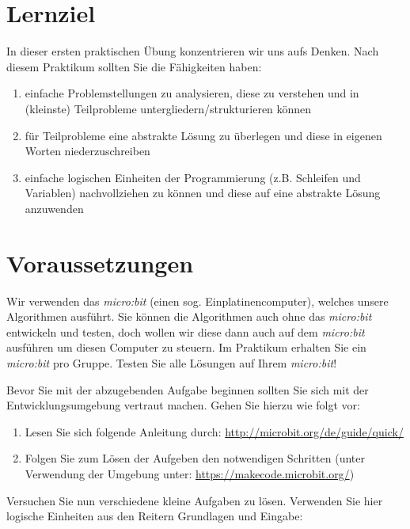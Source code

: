 \documentclass{hmLab}
\subtitle{Kontrollstrukturen mit dem micro:bit}
\author{Prof.\,Dr.-Ing.\,Martin Hobelsberger\\Dr.\,Benedikt Zönnchen\\Prof.\,Dr.-Ing.\,Benedikt Dietrich}
\begin{document}
\maketitle

\section*{Lernziel}

In dieser ersten praktischen Übung konzentrieren wir uns aufs Denken.
Nach diesem Praktikum sollten Sie die Fähigkeiten haben:

\begin{enumerate}[label=$\bullet$]
	\item einfache Problemstellungen zu analysieren, diese zu verstehen und in (kleinste) Teilprobleme untergliedern/strukturieren können 
	\item für Teilprobleme eine abstrakte Lösung zu überlegen und diese in eigenen Worten niederzuschreiben 
	\item einfache logischen Einheiten der Programmierung (z.B. Schleifen und Variablen) nachvollziehen zu können und diese auf eine abstrakte Lösung anzuwenden
\end{enumerate}

\section*{Voraussetzungen}

Wir verwenden das \textit{micro:bit} (einen sog. Einplatinencomputer), welches unsere Algorithmen ausführt.
Sie können die Algorithmen auch ohne das \textit{micro:bit} entwickeln und testen, doch wollen wir diese dann auch auf dem \textit{micro:bit} ausführen um diesen Computer zu steuern.
Im Praktikum erhalten Sie ein \textit{micro:bit} pro Gruppe.
Testen Sie alle Lösungen auf Ihrem \textit{micro:bit}!

\newpage


Bevor Sie mit der abzugebenden Aufgabe beginnen sollten Sie sich mit der Entwicklungsumgebung vertraut machen. 
Gehen Sie hierzu wie folgt vor:

\begin{enumerate}[label=(\arabic*)]
	\item Lesen Sie sich folgende Anleitung durch: \href{http://microbit.org/de/guide/quick/}{http://microbit.org/de/guide/quick/}
	\item Folgen Sie zum Lösen der Aufgeben den notwendigen Schritten (unter Verwendung der Umgebung unter: \href{https://makecode.microbit.org/}{https://makecode.microbit.org/})
\end{enumerate}
%
Versuchen Sie nun verschiedene kleine Aufgaben zu lösen.
Verwenden Sie hier logische Einheiten aus den Reitern Grundlagen und Eingabe:
\end{document}
